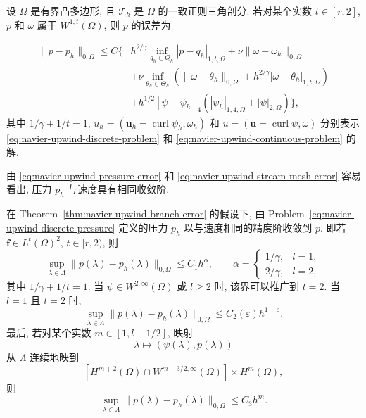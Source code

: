 \setcounter{statement}{4}
\begin{Lemma}\label{lem:navier-upwind-pressure-error}
设 $\Omega$ 是有界凸多边形, 且 $\mathcal T_h$ 是 $\bar\Omega$ 的一致正则三角剖分.
若对某个实数 $t\in[r,2]$, $p$ 和 $\omega$ 属于 $W^{1,t}(\Omega)$,
则 $p$ 的误差为

\begin{equation}\label{eq:navier-upwind-pressure-error}
\begin{aligned}
\|p-p_h\|_{0,\Omega}\leq C\Bigg\{
&h^{2/\gamma}\inf_{q_h\in Q_h}|p-q_h|_{1,t,\Omega}
+\nu\|\omega-\omega_h\|_{0,\Omega}\\
&+\nu\inf_{\theta_h\in\Theta_h}
(\|\omega-\theta_h\|_{0,\Omega}
+h^{2/\gamma}|\omega-\theta_h|_{1,t,\Omega})\\
&+h^{1/2}[\psi-\psi_h]_4
(|\psi_h|_{1,4,\Omega}+|\psi|_{2,\Omega})
\Bigg\},
\end{aligned}
\end{equation}
其中 $1/\gamma+1/t=1$,
$u_h=(\boldsymbol u_h=\operatorname{curl}\psi_h,\omega_h)$ 和
$u=(\boldsymbol u=\operatorname{curl}\psi,\omega)$ 分别表示
\eqref{eq:navier-upwind-discrete-problem} 和
\eqref{eq:navier-upwind-continuous-problem} 的解.
\end{Lemma}

由 \eqref{eq:navier-upwind-pressure-error} 和
\eqref{eq:navier-upwind-stream-mesh-error} 容易看出, 压力 $p_h$ 与速度具有相同收敛阶.

\setcounter{statement}{2}
\begin{Theorem}\label{thm:navier-upwind-pressure-convergence}
在 Theorem~\ref{thm:navier-upwind-branch-error} 的假设下,
由 Problem~\eqref{eq:navier-upwind-discrete-pressure} 定义的压力 $p_h$
以与速度相同的精度阶收敛到 $p$. 即若
$\boldsymbol f\in L^t(\Omega)^2$, $t\in[r,2)$, 则
\[
\sup_{\lambda\in\Lambda}\|p(\lambda)-p_h(\lambda)\|_{0,\Omega}
\leq C_1h^\alpha,
\qquad
\alpha=\begin{cases}
1/\gamma,&l=1,\\
2/\gamma,&l=2,
\end{cases}
\]
其中 $1/\gamma+1/t=1$. 当 $\psi\in W^{2,\infty}(\Omega)$ 或 $l\geq2$ 时,
该界可以推广到 $t=2$. 当 $l=1$ 且 $t=2$ 时,
\[
\sup_{\lambda\in\Lambda}\|p(\lambda)-p_h(\lambda)\|_{0,\Omega}
\leq C_2(\varepsilon)h^{1-\varepsilon}.
\]
最后, 若对某个实数 $m\in[1,l-1/2]$, 映射
\[
\lambda\mapsto(\psi(\lambda),p(\lambda))
\]
从 $\Lambda$ 连续地映到
\[
[H^{m+2}(\Omega)\cap W^{m+3/2,\infty}(\Omega)]\times H^m(\Omega),
\]
则
\[
\sup_{\lambda\in\Lambda}\|p(\lambda)-p_h(\lambda)\|_{0,\Omega}
\leq C_3h^m.
\]
\end{Theorem}
